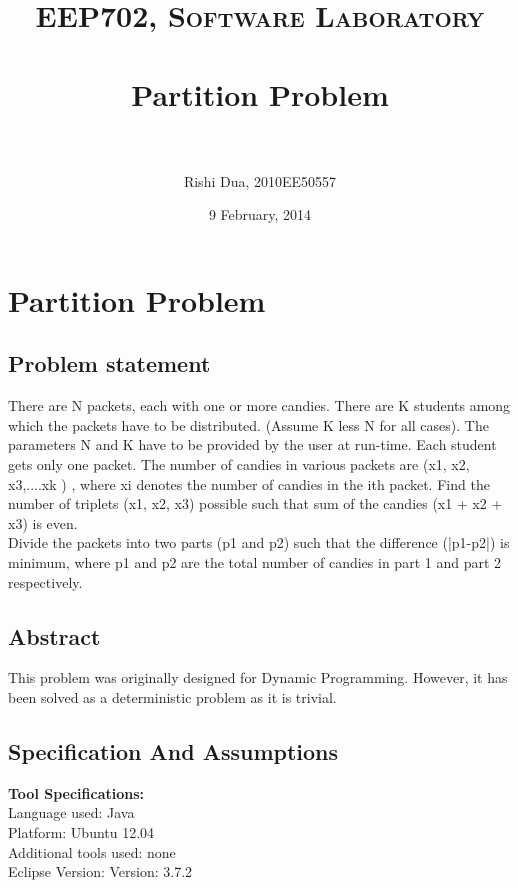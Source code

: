 \documentclass[paper=a4, fontsize=11pt]{scrartcl} %
\title{	
\normalfont \normalsize 
\textsc{EEP702, Software Laboratory} \\ [25pt] %
\horrule{0.5pt} \\[0.4cm] %
\huge Partition Problem \\ %
\horrule{2pt} \\[0.5cm] %
}
\author{Rishi Dua, 2010EE50557} %
\date{\normalsize 9 February, 2014} %
\numberwithin{equation}{section} %
\numberwithin{figure}{section} %
\numberwithin{table}{section} %
\begin{document}
\maketitle %


\section{Partition Problem}


\subsection{Problem statement}

There are N packets, each with one or more candies. There are K students among which the packets have to be distributed. (Assume K less N for all cases). The parameters N and K have to be provided by the user at run-time. Each student gets only one packet. The number of candies in various packets are (x1, x2, x3,....xk ) , where xi denotes the number of candies in the ith packet. Find the number of triplets (x1, x2, x3) possible such that sum of the candies (x1 + x2 + x3) is even.\\
Divide the packets into two parts (p1 and p2) such that the difference (|p1-p2|) is minimum, where p1 and p2 are the total number of candies in part 1 and part 2 respectively.

\subsection{Abstract}

This problem was originally designed for Dynamic Programming. However, it has been solved as a deterministic problem as it is trivial.


\subsection{Specification And Assumptions}
{\textbf {Tool Specifications:}}\\
Language used: Java\\
Platform: Ubuntu 12.04\\
Additional tools used: none\\
Eclipse Version: Version: 3.7.2\\
\end{document}

